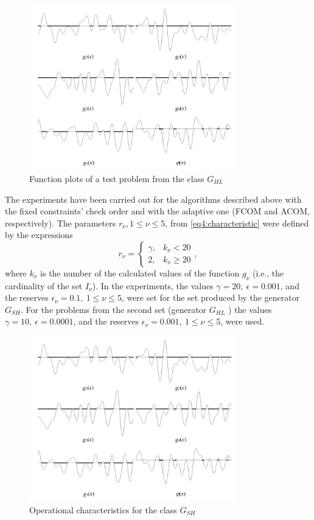 \begin{figure}[ht]
  \centering
  \includegraphics[width=0.8\textwidth]{figures/4_13.png}
  \caption{Function plots of a test problem from the class $G_{HL}$}
  \label{fig:4_13}
\end{figure}

The experiments have been carried out for the algorithms described above with the fixed constraints’ check order and with the adaptive one (FCOM and ACOM, respectively). The parameters $r_\nu, 1\le\nu\le 5$, from \eqref{eq4:characteristic} were defined by the expressions
\begin{displaymath}
  r_\nu = \left\{
  \begin{array}{lr}
    \gamma, & k_\nu < 20\\
    2, & k_\nu \ge 20
  \end{array}
  \right.,
\end{displaymath}
where $k_\nu$ is the number of the calculated values of the function $g_\nu$ (i.e., the cardinality of the set $I_\nu$). In the experiments, the values $\gamma=20,\: \epsilon = 0.001$, and the reserves $\epsilon_\nu=0.1,\: 1\le\nu\le 5$, were set for the set produced by the generator $G_{SH}$. For the problems from the second set (generator $G_{HL}$ ) the values  $\gamma=10,\: \epsilon = 0.0001$, and the reserves $\epsilon_\nu=0.001,\: 1\le\nu\le 5$, were used.

\begin{figure}[ht]
  \centering
  \includegraphics[width=0.8\textwidth]{figures/4_13.png}
  \caption{Operational characteristics for the class $G_{SH}$}
  \label{fig:4_14}
\end{figure}

